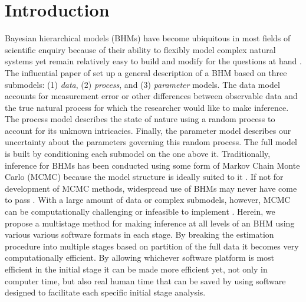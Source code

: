 \documentclass[12pt]{article}
\newcommand{\cmt}[1]{\todo[inline]{\color{blue} {\sc Comment:} \newline #1}}
\begin{document}
\vspace*{\fill}

\clearpage

\renewcommand{\baselinestretch}{1.5}\normalsize
\raggedright
\setlength{\parindent}{2em}
\raggedbottom
\linenumbers

\section{Introduction}

\cmt{Here's a comment if you want to say something}

Bayesian hierarchical models (BHMs) have become ubiquitous in most fields of scientific enquiry because of their ability to flexibly model complex natural systems yet remain relatively easy to build and modify for the questions at hand \citep{hobbs2015bayesian}. The influential paper of \cite{berliner1996hierarchical} set up a general description of a BHM based on three submodels: (1) {\it data}, (2) {\it process}, and (3) {\it parameter} models. The data model accounts for measurement error or other differences between observable data and the true natural process for which the researcher would like to make inference. The process model describes the state of nature using a random process to account for its unknown intricacies. Finally, the parameter model describes our uncertainty about the parameters governing this random process.  The full model is built by conditioning each submodel on the one above it. Traditionally, inference for BHMs has been conducted using some form of Markov Chain Monte Carlo (MCMC) because the model structure is ideally suited to it \citep{gelfand1990sampling,gelfand2015hierarchical}. If not for development of MCMC methods, widespread use of BHMs may never have come to pass \citep{green2015bayesian}. With a large amount of data or complex submodels, however, MCMC can be computationally challenging or infeasible to implement \citep{hooten2018prior, wikle2003hierarchical}. Herein, we propose a multistage method for making inference at all levels of an BHM using various various software formats in each stage. By breaking the estimation procedure into multiple stages based on partition of the full data it becomes very computationally efficient. By allowing whichever software platform is most efficient in the initial stage it can be made more efficient yet, not only in computer time, but also real human time that can be saved by using software designed to facilitate each specific initial stage analysis. 
\end{document}
